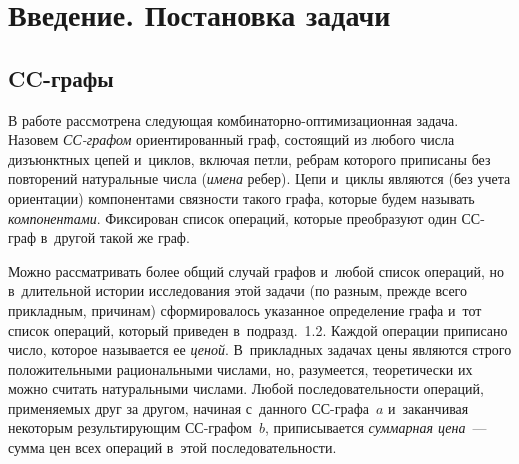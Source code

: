 


\thispagestyle{headings}

\begin{multicols}{2}

\label{st\stat}

  \section{Введение. Постановка задачи}
   
  \subsection{CC-графы}
  
  В работе рассмотрена следующая  
ком\-би\-на\-тор\-но-оп\-ти\-ми\-за\-ци\-он\-ная задача. Назовем  
\textit{СС-гра\-фом} ориентированный граф, состоящий из любого чис\-ла 
дизъюнктных цепей и~циклов, включая петли, реб\-рам которого приписаны без 
повторений натуральные числа (\textit{имена} ре\-бер). Цепи и~циклы являются 
(без учета ориентации) компонентами связности такого графа, которые будем 
называть \textit{компонента\-ми}. Фиксирован список операций, которые 
преобразуют один СС-граф в~другой такой же граф. 

Можно рассматривать более 
общий случай графов и~любой список операций, но в~длительной истории 
исследования этой задачи (по разным, прежде всего прикладным, причинам) 
сформировалось указанное определение графа и~тот список операций, который 
приведен в~подразд.~1.2. Каж\-дой операции приписано число, которое 
называется ее \textit{ценой}. В~прикладных задачах цены являются строго 
положительными рациональными числами, но, разумеется, теоретически их 
можно считать натуральными числами. Любой последовательности операций, 
применяемых друг за другом, начиная с~данного СС-гра\-фа~$a$ и~заканчивая 
некоторым результирующим СС-гра\-фом~$b$, приписывается 
\textit{суммарная цена}~--- сумма цен всех операций в~этой 
последовательности. 

\begin{figure*}[b] %
\vspace*{12pt}
\begin{center}
\mbox{%
\epsfxsize=101.723mm
}
\end{center}
\vspace*{-9pt}
\vspace*{12pt}
\begin{center}
\mbox{%
\epsfxsize=95.006mm
}
\end{center}
\vspace*{-9pt}
  \end{figure*}
  

\end{multicols}
